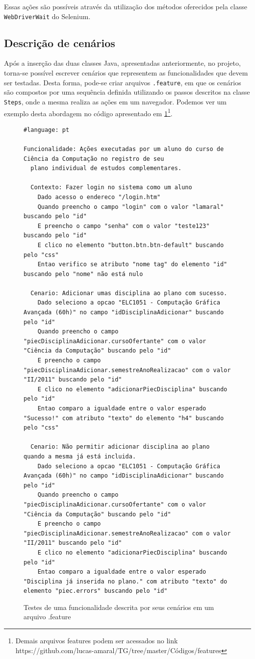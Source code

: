 \documentclass[tg]{mdtufsm}
\begin{document}
Essas ações são possíveis através da utilização dos métodos oferecidos pela classe \texttt{WebDriverWait} do Selenium.

\subsection{Descrição de cenários}
Após a inserção das duas classes Java, apresentadas anteriormente, no projeto, torna-se possível escrever cenários que representem as funcionalidades que devem ser testadas.
Desta forma, pode-se criar arquivos \texttt{.feature}, em que os cenários são compostos por uma sequência definida utilizando os passos descritos na classe \texttt{Steps}, onde a mesma realiza as ações em um navegador.
Podemos ver um exemplo desta abordagem no código apresentado em \ref{code:feature}\footnote{Demais arquivos features podem ser acessados no link https://github.com/lucas-amaral/TG/tree/master/Códigos/features}.

\begin{figure}[!htt]
	\begin{lstlisting}
#language: pt

Funcionalidade: Ações executadas por um aluno do curso de Ciência da Computação no registro de seu
  plano individual de estudos complementares.

  Contexto: Fazer login no sistema como um aluno
    Dado acesso o endereco "/login.htm"
    Quando preencho o campo "login" com o valor "lamaral" buscando pelo "id"
    E preencho o campo "senha" com o valor "teste123" buscando pelo "id"
    E clico no elemento "button.btn.btn-default" buscando pelo "css"
    Entao verifico se atributo "nome tag" do elemento "id" buscando pelo "nome" não está nulo

  Cenario: Adicionar umas disciplina ao plano com sucesso.
    Dado seleciono a opcao "ELC1051 - Computação Gráfica Avançada (60h)" no campo "idDisciplinaAdicionar" buscando pelo "id"
    Quando preencho o campo "piecDisciplinaAdicionar.cursoOfertante" com o valor "Ciência da Computação" buscando pelo "id"
    E preencho o campo "piecDisciplinaAdicionar.semestreAnoRealizacao" com o valor "II/2011" buscando pelo "id"
    E clico no elemento "adicionarPiecDisciplina" buscando pelo "id"
    Entao comparo a igualdade entre o valor esperado "Sucesso!" com atributo "texto" do elemento "h4" buscando pelo "css"

  Cenario: Não permitir adicionar disciplina ao plano quando a mesma já está incluida.
    Dado seleciono a opcao "ELC1051 - Computação Gráfica Avançada (60h)" no campo "idDisciplinaAdicionar" buscando pelo "id"
    Quando preencho o campo "piecDisciplinaAdicionar.cursoOfertante" com o valor "Ciência da Computação" buscando pelo "id"
    E preencho o campo "piecDisciplinaAdicionar.semestreAnoRealizacao" com o valor "II/2011" buscando pelo "id"
    E clico no elemento "adicionarPiecDisciplina" buscando pelo "id"
    Entao comparo a igualdade entre o valor esperado "Disciplina já inserida no plano." com atributo "texto" do elemento "piec.errors" buscando pelo "id"
	\end{lstlisting}
	\caption{Testes de uma funcionalidade descrita por seus cenários em um arquivo .feature}
	\label{code:feature}
\end{figure}
\end{document}

